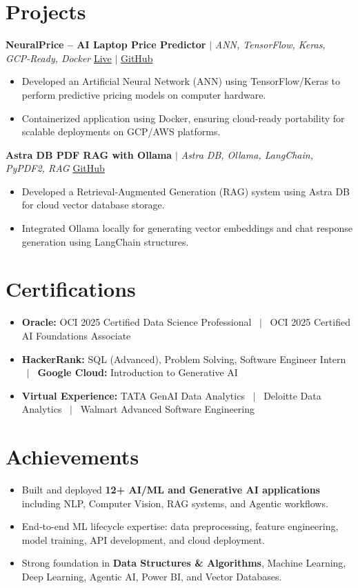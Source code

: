 \documentclass[a4paper,9pt]{article}
\newcommand{\resumeItem}[1]{\item\small #1}
\begin{document}
\vspace{-2mm}

\section{Projects}

\noindent\textbf{NeuralPrice -- AI Laptop Price Predictor} $|$ \textit{ANN, TensorFlow, Keras, GCP-Ready, Docker} \hfill
\href{https://huggingface.co/spaces/Harsh0809/laptop-price-predictor-Ann}{\small Live} $|$
\href{https://github.com/hsachan295-source/Laptop-Price-Prediction-ANN}{\small GitHub}
\begin{itemize}
\resumeItem{Developed an Artificial Neural Network (ANN) using TensorFlow/Keras to perform predictive pricing models on computer hardware.}
\resumeItem{Containerized application using Docker, ensuring cloud-ready portability for scalable deployments on GCP/AWS platforms.}
\end{itemize}

\vspace{1.5pt}
\noindent\textbf{Astra DB PDF RAG with Ollama} $|$ \textit{Astra DB, Ollama, LangChain, PyPDF2, RAG} \hfill
\href{https://github.com/hsachan295-source/astra-db-pdf-rag-ollama}{\small GitHub}
\begin{itemize}
\resumeItem{Developed a Retrieval-Augmented Generation (RAG) system using Astra DB for cloud vector database storage.}
\resumeItem{Integrated Ollama locally for generating vector embeddings and chat response generation using LangChain structures.}
\end{itemize}


\vspace{-2mm}

\section{Certifications}
\begin{itemize}
\resumeItem{\textbf{Oracle:} OCI 2025 Certified Data Science Professional ~$|$~ OCI 2025 Certified AI Foundations Associate}
\resumeItem{\textbf{HackerRank:} SQL (Advanced), Problem Solving, Software Engineer Intern ~$|$~ \textbf{Google Cloud:} Introduction to Generative AI}
\resumeItem{\textbf{Virtual Experience:} TATA GenAI Data Analytics ~$|$~ Deloitte Data Analytics ~$|$~ Walmart Advanced Software Engineering}
\end{itemize}

\vspace{-2mm}

\section{Achievements}
\begin{itemize}
\resumeItem{Built and deployed \textbf{12+ AI/ML and Generative AI applications} including NLP, Computer Vision, RAG systems, and Agentic workflows.}
\resumeItem{End-to-end ML lifecycle expertise: data preprocessing, feature engineering, model training, API development, and cloud deployment.}
\resumeItem{Strong foundation in \textbf{Data Structures \& Algorithms}, Machine Learning, Deep Learning, Agentic AI, Power BI, and Vector Databases.}
\end{itemize}
\end{document}

